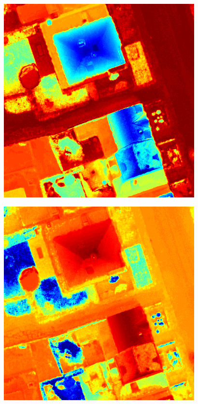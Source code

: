 \documentclass[a0,landscape]{a0poster}
\begin{document}
\begin{multicols}{4}
{ \centering
  \begin{minipage}{0.45\columnwidth}
    \centering
    \includegraphics[width=\textwidth]{./Images/DFC2015/evec01.png}%
  \end{minipage}\hfill %
  \begin{minipage}{0.45\columnwidth}
    \centering
    \includegraphics[width=\textwidth]{./Images/DFC2015/evec02.png}
  \end{minipage}
  \label{fig:DFCfig2}
}


\end{multicols}
\end{document}
